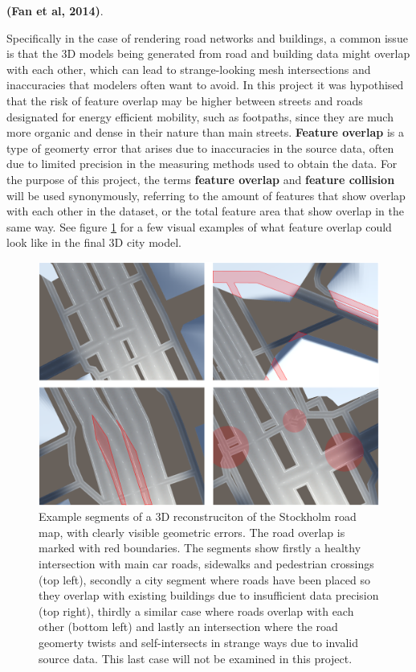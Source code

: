 \documentclass{kththesis}
\begin{document}
\textbf{(Fan et al, 2014)}.

Specifically in the case of rendering road networks and buildings, a common issue is that the 3D models being generated from road and building data might overlap with each other, which can lead to strange-looking mesh intersections and inaccuracies that modelers often want to avoid.
In this project it was hypothised that the risk of feature overlap may be higher between streets and roads designated for energy efficient mobility, such as footpaths, since they are much more organic and dense in their nature than main streets.
\textbf{Feature overlap} is a type of geomerty error that arises due to inaccuracies in the source data, often due to limited precision in the measuring methods used to obtain the data.
For the purpose of this project, the terms \textbf{feature overlap} and \textbf{feature collision} will be used synonymously, referring to the amount of features that show overlap with each other in the dataset, or the total feature area that show overlap in the same way.
See figure \ref{fig:img_road_error_cases} for a few visual examples of what feature overlap could look like in the final 3D city model.


\begin{figure}[H]
    \centering
    \includegraphics[width=\textwidth,height=0.5\textheight,keepaspectratio]{img_road_error_cases}
    \caption{Example segments of a 3D reconstruciton of the Stockholm road map, with clearly visible geometric errors. The road overlap is marked with red boundaries. The segments show firstly a healthy intersection with main car roads, sidewalks and pedestrian crossings (top left), secondly a city segment where roads have been placed so they overlap with existing buildings due to insufficient data precision (top right), thirdly a similar case where roads overlap with each other (bottom left) and lastly an intersection where the road geomerty twists and self-intersects in strange ways due to invalid source data. This last case will not be examined in this project.}
    \label{fig:img_road_error_cases}
\end{figure}
\end{document}

